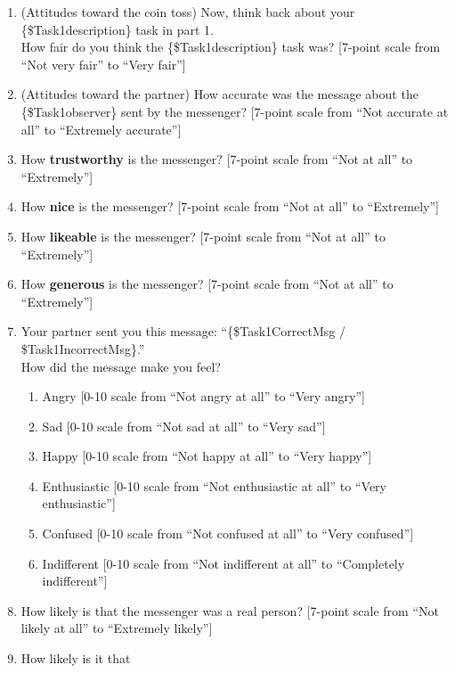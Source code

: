 \begin{enumerate} 
    \item (Attitudes toward the coin toss) Now, think back about your \{\$Task1description\} task in part 1.
    \\
    How fair do you think the \{\$Task1description\} task was? [7-point scale
    from ``Not very fair'' to ``Very fair'']
    \item (Attitudes toward the partner) How accurate was the message
    about the \{\$Task1observer\} sent by the messenger? [7-point scale from ``Not
    accurate at all'' to ``Extremely accurate'']
    \item How \textbf{trustworthy} is the messenger? [7-point scale from ``Not at
    all'' to ``Extremely'']
    \item How \textbf{nice} is the messenger? [7-point scale from ``Not at all'' to
    ``Extremely'']
    \item How \textbf{likeable} is the messenger? [7-point scale from ``Not at all''
    to ``Extremely'']
    \item How \textbf{generous} is the messenger? [7-point scale from ``Not at all''
    to ``Extremely'']
    \item Your partner sent you this message: ``\{\$Task1CorrectMsg / \$Task1IncorrectMsg\}.''
    \\
    How did the message make you feel?
    \begin{enumerate}
        \item Angry [0-10 scale from ``Not angry at all'' to ``Very
        angry'']
        \item Sad [0-10 scale from ``Not sad at all'' to ``Very sad'']
        \item Happy [0-10 scale from ``Not happy at all'' to ``Very
        happy'']
        \item Enthusiastic [0-10 scale from ``Not enthusiastic at all''
        to ``Very enthusiastic'']
        \item Confused [0-10 scale from ``Not confused at all'' to
        ``Very confused'']
        \item Indifferent [0-10 scale from ``Not indifferent at all'' to
        ``Completely indifferent'']
    \end{enumerate}
    \item How likely is that the messenger was a real person? [7-point scale
    from ``Not likely at all'' to ``Extremely likely'']
    \item How likely is it that

\end{enumerate}

